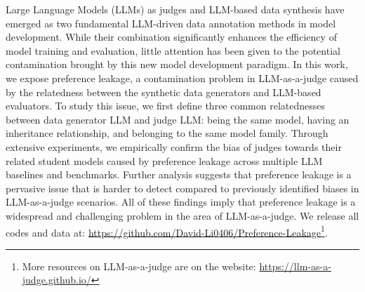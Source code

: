 Large Language Models (LLMs) as judges and LLM-based data synthesis have emerged as two fundamental LLM-driven data annotation methods in model development. While their combination significantly enhances the efficiency of model training and evaluation, little attention has been given to the potential contamination brought by this new model development paradigm. In this work, we expose preference leakage, a contamination problem in LLM-as-a-judge caused by the relatedness between the synthetic data generators and LLM-based evaluators. To study this issue, we first define three common relatednesses between data generator LLM and judge LLM: being the same model, having an inheritance relationship, and belonging to the same model family. Through extensive experiments, we empirically confirm the bias of judges towards their related student models caused by preference leakage across multiple LLM baselines and benchmarks. Further analysis suggests that preference leakage is a pervasive issue that is harder to detect compared to previously identified biases in LLM-as-a-judge scenarios. All of these findings imply that preference leakage is a widespread and challenging problem in the area of LLM-as-a-judge. We release all codes and data at: \url{https://github.com/David-Li0406/Preference-Leakage}\footnote{More resources on LLM-as-a-judge are on the website: \url{https://llm-as-a-judge.github.io/}}.